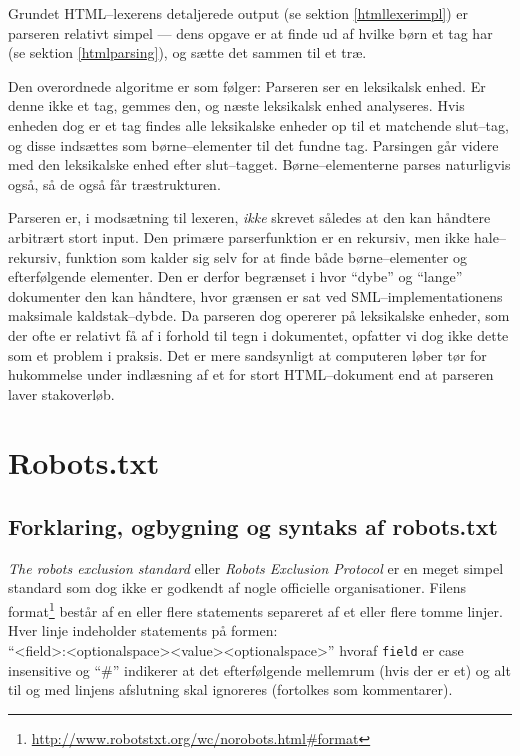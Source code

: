 \documentclass[a4paper,oneside]{memoir}
\begin{document}
Grundet HTML--lexerens detaljerede output (se sektion
\ref{htmllexerimpl}) er parseren relativt simpel --- dens opgave er at
finde ud af hvilke børn et tag har (se sektion \ref{htmlparsing}), og
sætte det sammen til et træ.

Den overordnede algoritme er som følger: Parseren ser en leksikalsk
enhed. Er denne ikke et tag, gemmes den, og næste leksikalsk enhed
analyseres. Hvis enheden dog er et tag findes alle leksikalske enheder
op til et matchende slut--tag, og disse indsættes som børne--elementer
til det fundne tag. Parsingen går videre med den leksikalske enhed
efter slut--tagget. Børne--elementerne parses naturligvis også, så de
også får træstrukturen.

Parseren er, i modsætning til lexeren, \textit{ikke} skrevet således
at den kan håndtere arbitrært stort input. Den primære parserfunktion
er en rekursiv, men ikke hale--rekursiv, funktion som kalder sig selv
for at finde både børne--elementer og efterfølgende elementer. Den er
derfor begrænset i hvor ``dybe'' og ``lange'' dokumenter den kan
håndtere, hvor grænsen er sat ved SML--implementationens maksimale
kaldstak--dybde. Da parseren dog opererer på leksikalske enheder, som
der ofte er relativt få af i forhold til tegn i dokumentet, opfatter
vi dog ikke dette som et problem i praksis. Det er mere sandsynligt at
computeren løber tør for hukommelse under indlæsning af et for stort
HTML--dokument end at parseren laver stakoverløb.

\section{Robots.txt}
\label{Robots} 


\subsection{Forklaring, ogbygning og syntaks af robots.txt}

\textit{The robots exclusion standard} eller \textit{Robots Exclusion Protocol}
er en meget simpel standard som dog ikke er godkendt af nogle officielle
organisationer. 
Filens format\footnote{\url{http://www.robotstxt.org/wc/norobots.html\#format}}
består af en eller flere statements separeret af et eller flere tomme linjer.
Hver linje indeholder statements på formen:\\
``<field>:<optionalspace><value><optionalspace>'' hvoraf \texttt{field} er case
insensitive og ``\#'' indikerer at det efterfølgende mellemrum (hvis der er et)
og alt til og med linjens afslutning skal ignoreres (fortolkes som kommentarer).
\end{document}
